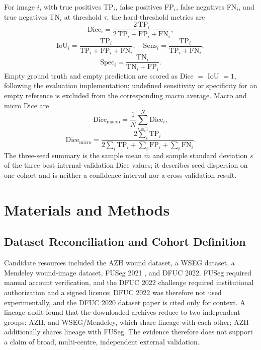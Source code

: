 \documentclass[conference]{IEEEtran}
\begin{document}
For image $i$, with true positives TP$_i$, false positives FP$_i$, false negatives FN$_i$, and true negatives TN$_i$ at threshold $\tau$, the hard-threshold metrics are
\begin{equation}
\mathrm{Dice}_i=\frac{2\,\mathrm{TP}_i}{2\,\mathrm{TP}_i+\mathrm{FP}_i+\mathrm{FN}_i},
\label{eq:dice}
\end{equation}
\begin{equation}
\mathrm{IoU}_i=\frac{\mathrm{TP}_i}{\mathrm{TP}_i+\mathrm{FP}_i+\mathrm{FN}_i},\quad
\mathrm{Sens}_i=\frac{\mathrm{TP}_i}{\mathrm{TP}_i+\mathrm{FN}_i},
\label{eq:iou_sens}
\end{equation}
\begin{equation}
\mathrm{Spec}_i=\frac{\mathrm{TN}_i}{\mathrm{TN}_i+\mathrm{FP}_i}.
\label{eq:spec}
\end{equation}
Empty ground truth and empty prediction are scored as Dice $=$ IoU $=1$, following the evaluation implementation; undefined sensitivity or specificity for an empty reference is excluded from the corresponding macro average. Macro and micro Dice are
\begin{equation}
\mathrm{Dice}_{\mathrm{macro}}=\frac{1}{N}\sum_{i=1}^{N}\mathrm{Dice}_i,
\label{eq:macro}
\end{equation}
\begin{equation}
\mathrm{Dice}_{\mathrm{micro}}=\frac{2\sum_i \mathrm{TP}_i}{2\sum_i\mathrm{TP}_i+\sum_i\mathrm{FP}_i+\sum_i\mathrm{FN}_i}.
\label{eq:micro}
\end{equation}
The three-seed summary is the sample mean $\bar{m}$ and sample standard deviation $s$ of the three best internal-validation Dice values; it describes seed dispersion on one cohort and is neither a confidence interval nor a cross-validation result.

\section{Materials and Methods}
\label{sec:method}

\subsection{Dataset Reconciliation and Cohort Definition}

Candidate resources included the AZH wound dataset, a WSEG dataset, a Mendeley wound-image dataset, FUSeg 2021 \cite{Wang2024FUSeg}, and DFUC 2022. FUSeg required manual account verification, and the DFUC 2022 challenge required institutional authorization and a signed licence; DFUC 2022 was therefore not used experimentally, and the DFUC 2020 dataset paper \cite{Cassidy2021DFUC2020} is cited only for context. A lineage audit found that the downloaded archives reduce to two independent groups: AZH, and WSEG/Mendeley, which share lineage with each other; AZH additionally shares lineage with FUSeg. The evidence therefore does not support a claim of broad, multi-centre, independent external validation.
\end{document}
